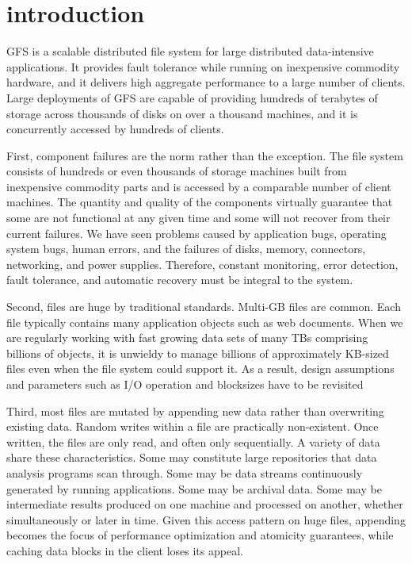 \documentclass{article}
\begin{document}
\section{introduction}
GFS is a scalable distributed file system for large distributed data-intensive
applications. It provides fault tolerance while running on inexpensive
commodity hardware, and it delivers high aggregate performance to a large
number of clients. Large deployments of GFS are capable of providing hundreds
of terabytes of storage across thousands of disks on over a thousand machines,
and it is concurrently accessed by hundreds of clients.

First, component failures are the norm rather than the
exception. The file system consists of hundreds or even
thousands of storage machines built from inexpensive commodity parts and is accessed by a comparable number of
client machines. The quantity and quality of the components virtually guarantee that some are not functional at
any given time and some will not recover from their current failures. We have seen problems caused by application
bugs, operating system bugs, human errors, and the failures
of disks, memory, connectors, networking, and power supplies. Therefore, constant monitoring, error detection, fault
tolerance, and automatic recovery must be integral to the
system.

Second, files are huge by traditional standards. Multi-GB
files are common. Each file typically contains many application objects such as web documents. When we are regularly
working with fast growing data sets of many TBs comprising
billions of objects, it is unwieldy to manage billions of approximately KB-sized files even when the file system could
support it. As a result, design assumptions and parameters
such as I/O operation and blocksizes have to be revisited

Third, most files are mutated by appending new data rather than overwriting
existing data. Random writes within a file are practically non-existent. Once
written, the files are only read, and often only sequentially. A variety of
data share these characteristics. Some may constitute large repositories that
data analysis programs scan through. Some may be data streams continuously
generated by running applications. Some may be archival data. Some may be
intermediate results produced on one machine and processed on another, whether
simultaneously or later in time. Given this access pattern on huge files,
appending becomes the focus of performance optimization and atomicity
guarantees, while caching data blocks in the client loses its appeal.
\end{document}
